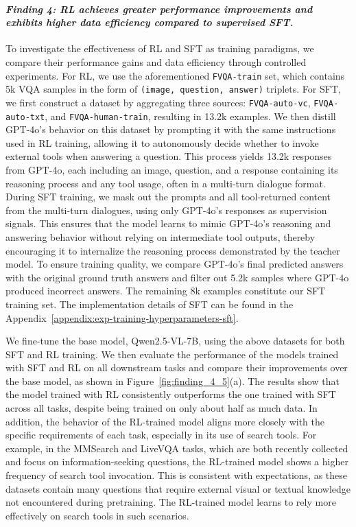 \documentclass{article}
\begin{document}
\paragraph{\textit{Finding 4: RL achieves greater performance improvements and exhibits higher data efficiency compared to supervised SFT.}} To investigate the effectiveness of RL and SFT as training paradigms, we compare their performance gains and data efficiency through controlled experiments. For RL, we use the aforementioned \texttt{FVQA-train} set, which contains 5k VQA samples in the form of \texttt{(image, question, answer)} triplets. For SFT, we first construct a dataset by aggregating three sources: \texttt{FVQA-auto-vc}, \texttt{FVQA-auto-txt}, and \texttt{FVQA-human-train}, resulting in 13.2k examples. We then distill GPT-4o's behavior on this dataset by prompting it with the same instructions used in RL training, allowing it to autonomously decide whether to invoke external tools when answering a question. This process yields 13.2k responses from GPT-4o, each including an image, question, and a response containing its reasoning process and any tool usage, often in a multi-turn dialogue format. During SFT training, we mask out the prompts and all tool-returned content from the multi-turn dialogues, using only GPT-4o's responses as supervision signals. This ensures that the model learns to mimic GPT-4o’s reasoning and answering behavior without relying on intermediate tool outputs, thereby encouraging it to internalize the reasoning process demonstrated by the teacher model. To ensure training quality, we compare GPT-4o's final predicted answers with the original ground truth answers and filter out 5.2k samples where GPT-4o produced incorrect answers. The remaining 8k examples constitute our SFT training set. The implementation details of SFT can be found in the Appendix~\ref{appendix:exp-training-hyperparameters-sft}.

We fine-tune the base model, Qwen2.5-VL-7B, using the above datasets for both SFT and RL training. We then evaluate the performance of the models trained with SFT and RL on all downstream tasks and compare their improvements over the base model, as shown in Figure~\ref{fig:finding_4_5}(a). The results show that the model trained with RL consistently outperforms the one trained with SFT across all tasks, despite being trained on only about half as much data. In addition, the behavior of the RL-trained model aligns more closely with the specific requirements of each task, especially in its use of search tools. For example, in the MMSearch and LiveVQA tasks, which are both recently collected and focus on information-seeking questions, the RL-trained model shows a higher frequency of search tool invocation. This is consistent with expectations, as these datasets contain many questions that require external visual or textual knowledge not encountered during pretraining. The RL-trained model learns to rely more effectively on search tools in such scenarios.
\end{document}
